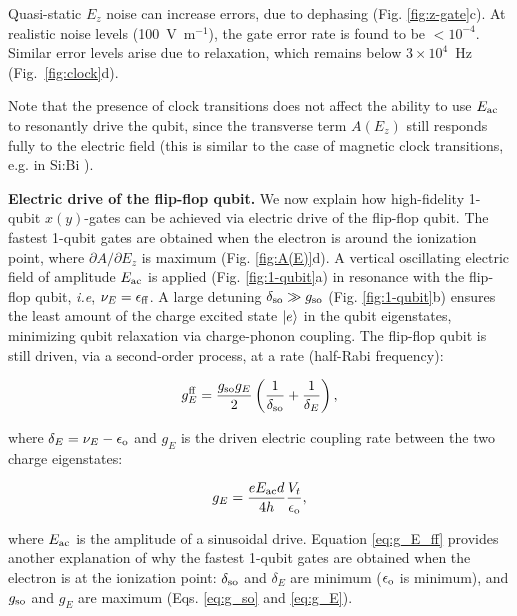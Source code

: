 \documentclass[aps,prb,superscriptaddress,nobibnotes,preprint]{revtex4-1}%
\begin{document}
Quasi-static $E_z$ noise can increase errors, due to dephasing (Fig. \ref{fig:z-gate}c). At realistic noise levels (100~V~m$^{-1}$), the gate error rate is found to be $<10^{-4}$. Similar error levels arise due to relaxation, which remains below $3\times10^4$~Hz (Fig.~\ref{fig:clock}d).

Note that the presence of clock transitions does not affect the ability to use $E_{\rm ac}$ to resonantly drive the qubit, since the transverse term $A(E_z)$ still responds fully to the electric field (this is similar to the case of magnetic clock transitions, e.g. in Si:Bi \cite{Wolfowicz2013}).


\vspace{3mm}
\noindent\textbf{Electric drive of the flip-flop qubit.}
%
We now explain how high-fidelity 1-qubit $x(y)$-gates can be achieved via electric drive of the flip-flop qubit. The fastest 1-qubit gates are obtained when the electron is around the ionization point, where $\partial A/\partial E_z$ is maximum (Fig. \ref{fig:A(E)}d). A vertical oscillating electric field of amplitude $E_{\rm ac}$ is applied (Fig. \ref{fig:1-qubit}a) in resonance with the flip-flop qubit, \textit{i.e}, $\nu_E=\epsilon_{\rm ff}$. A large detuning $\delta_{\rm so}\gg g_{\rm so}$ (Fig. \ref{fig:1-qubit}b) ensures the least amount of the charge excited state $\ket{e}$ in the qubit eigenstates, minimizing qubit relaxation via charge-phonon coupling. The flip-flop qubit is still driven, via a second-order process, at a rate (half-Rabi frequency):

\begin{equation} \label{eq:g_E_ff}
g^{\rm ff}_{E}=\frac{g_{\rm so}g_{E}}{2}\left(\frac{1}{\delta_{\rm so}}+\frac{1}{\delta_E}\right),
\end{equation}

where $\delta_E=\nu_E-\epsilon_{\rm o}$ and $g_{E}$ is the driven electric coupling rate between the two charge eigenstates:

\begin{equation} \label{eq:g_E}
g_{E}=\frac{e E_{\rm ac} d}{4h}\frac{V_t}{\epsilon_{\rm o}},
\end{equation}

where $E_{\rm ac}$ is the amplitude of a sinusoidal drive. Equation \ref{eq:g_E_ff} provides another explanation of why the fastest 1-qubit gates are obtained when the electron is at the ionization point: $\delta_{\rm so}$ and $\delta_E$ are minimum ($\epsilon_{\rm o}$ is minimum), and $g_{\rm so}$ and $g_E$ are maximum (Eqs. \ref{eq:g_so} and \ref{eq:g_E}).
\end{document}
